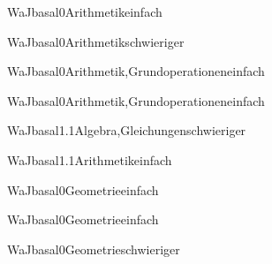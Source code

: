 \documentclass[12pt]{article}
\begin{document}
\begin{Add}{WaJ}{basal0}{Arithmetik}{einfach}
\end{Add}

\begin{Add}{WaJ}{basal0}{Arithmetik}{schwieriger}
\end{Add}

\begin{Add}{WaJ}{basal0}{Arithmetik,Grundoperationen}{einfach}
\end{Add}

\begin{Add}{WaJ}{basal0}{Arithmetik,Grundoperationen}{einfach}
\end{Add}

\begin{Add}{WaJ}{basal1.1}{Algebra,Gleichungen}{schwieriger}
\end{Add}

\begin{Add}{WaJ}{basal1.1}{Arithmetik}{einfach}
\end{Add}

\begin{Add}{WaJ}{basal0}{Geometrie}{einfach}
\end{Add}

\begin{Add}{WaJ}{basal0}{Geometrie}{einfach}
\end{Add}

\begin{Add}{WaJ}{basal0}{Geometrie}{schwieriger}
\end{Add}
\end{document}

